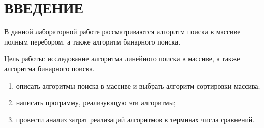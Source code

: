 \chapter*{ВВЕДЕНИЕ}

В данной лабораторной работе рассматриваются алгоритм поиска в массиве полным перебором, а также алгоритм бинарного поиска.

Цель работы: исследование алгоритма линейного поиска в массиве, а также алгоритма бинарного поиска.

\begin{enumerate}[label={\arabic*)}]
	\item описать алгоритмы поиска в массиве и выбрать алгоритм сортировки массива;
	\item написать программу, реализующую эти алгоритмы;
	\item провести анализ затрат реализаций алгоритмов в терминах числа сравнений.
\end{enumerate}